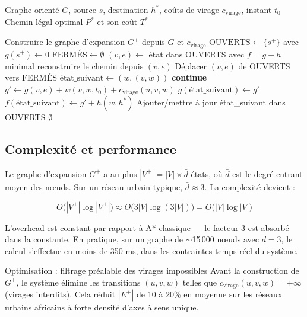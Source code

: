 \documentclass[12pt,a4paper]{article}
\theoremstyle{definition}
\theoremstyle{remark}
\begin{document}
\begin{algorithm}[H]
\caption{A* Robuste sur graphe d'expansion (Twist 7)}
\begin{algorithmic}[1]
\Require Graphe orienté $G$, source $s$, destination $h^*$,
         coûts de virage $c_\text{virage}$, instant $t_0$
\Ensure Chemin légal optimal $P^*$ et son coût $T^*$

\State Construire le graphe d'expansion $G^+$ depuis $G$ et $c_\text{virage}$
\State $\text{OUVERTS} \leftarrow \{s^+\}$ avec $g(s^+) \leftarrow 0$
\State $\text{FERMÉS} \leftarrow \emptyset$
  \State $(v, e) \leftarrow$ état dans OUVERTS avec $f = g + h$ minimal
    \State \Return reconstruire le chemin depuis $(v, e)$
  \EndIf
  \State Déplacer $(v, e)$ de OUVERTS vers FERMÉS
    \State $\text{état\_suivant} \leftarrow (w, (v,w))$
     \textbf{continue} \EndIf
    \State $g' \leftarrow g(v,e) + w(v,w,t_0) + c_\text{virage}(u,v,w)$
      \State $g(\text{état\_suivant}) \leftarrow g'$
      \State $f(\text{état\_suivant}) \leftarrow g' + h(w, h^*)$
      \State Ajouter/mettre à jour état\_suivant dans OUVERTS
    \EndIf
  \EndFor
\EndWhile
\State \Return $\emptyset$ 
\end{algorithmic}
\end{algorithm}

\subsection{Complexité et performance}

Le graphe d'expansion $G^+$ a au plus $|V^+| = |V| \times \bar{d}$
états, où $\bar{d}$ est le degré entrant moyen des nœuds. Sur un
réseau urbain typique, $\bar{d} \approx 3$. La complexité devient :

\[
  O\bigl(|V^+| \log |V^+|\bigr) \approx O\bigl(3|V| \log(3|V|)\bigr)
  = O\bigl(|V| \log |V|\bigr)
\]

L'overhead est constant par rapport à A* classique — le facteur 3
est absorbé dans la constante. En pratique, sur un graphe de
$\sim$15\,000 nœuds avec $\bar{d} = 3$, le calcul s'effectue en
moins de 350 ms, dans les contraintes temps réel du système.

\begin{alertbox}{Optimisation : filtrage préalable des virages impossibles}
Avant la construction de $G^+$, le système élimine les transitions
$(u, v, w)$ telles que $c_\text{virage}(u, v, w) = +\infty$
(virages interdits). Cela réduit $|E^+|$ de 10 à 20\% en moyenne
sur les réseaux urbains africains à forte densité d'axes à sens unique.
\end{alertbox}
\end{document}

